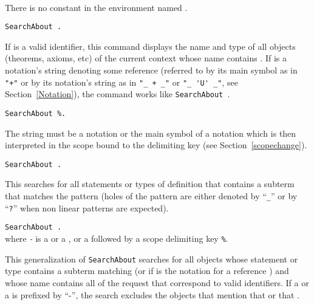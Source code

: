 \begin{ErrMsgs}
\item {}\\
    There is no constant in the environment named \qualid.
\end{ErrMsgs}

\newcommand{\termpatternorstr}{{\termpattern}\textrm{\textsl{-}}{\str}}

\begin{Variants}
\item {\tt SearchAbout {\str}.}

If {\str} is a valid identifier, this command displays the name and type
of all objects (theorems, axioms, etc) of the current context whose
name contains {\str}. If {\str} is a notation's string denoting some
reference {\qualid} (referred to by its main symbol as in \verb="+"=
or by its notation's string as in \verb="_ + _"= or \verb="_ 'U' _"=, see
Section~\ref{Notation}), the command works like {\tt SearchAbout
{\qualid}}.

\item {\tt SearchAbout {\str}\%{\delimkey}.}

The string {\str} must be a notation or the main symbol of a notation
which is then interpreted in the scope bound to the delimiting key
{\delimkey} (see Section~\ref{scopechange}).

\item {\tt SearchAbout {\termpattern}.}

This searches for all statements or types of definition that contains
a subterm that matches the pattern {\termpattern} (holes of the
pattern are either denoted by ``{\texttt \_}'' or
by ``{\texttt ?{\ident}}'' when non linear patterns are expected).

\item {\tt SearchAbout \nelist{\zeroone{-}{\termpatternorstr}}{}.}\\

\noindent where {\termpatternorstr} is a
{\termpattern} or a {\str}, or a {\str} followed by a scope
delimiting key {\tt \%{\delimkey}}.

This generalization of {\tt SearchAbout} searches for all objects
whose statement or type contains a subterm matching {\termpattern} (or
{\qualid} if {\str} is the notation for a reference {\qualid}) and
whose name contains all {\str} of the request that correspond to valid
identifiers. If a {\termpattern} or a {\str} is prefixed by ``-'', the
search excludes the objects that mention that {\termpattern} or that
{\str}.


\end{Variants}
